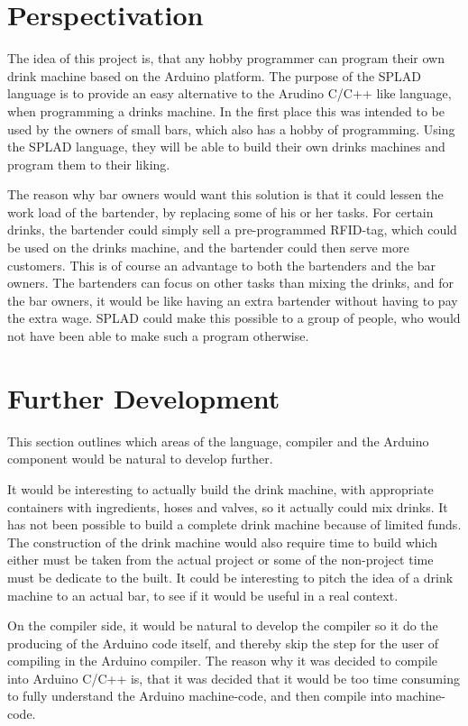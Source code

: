 \section{Perspectivation}
\label{sec:perspektivering}
The idea of this project is, that any hobby programmer can program their own drink machine based on the Arduino platform. The purpose of the SPLAD language is to provide an easy alternative to the Arudino C/C++ like language, when programming a drinks machine. In the first place this was intended to be used by the owners of small bars, which also has a hobby of programming. Using the SPLAD language, they will be able to build their own drinks machines and program them to their liking.

The reason why bar owners would want this solution is that it could lessen the work load of the bartender, by replacing some of his or her tasks. For certain drinks, the bartender could simply sell a pre-programmed RFID-tag, which could be used on the drinks machine, and the bartender could then serve more customers. This is of course an advantage to both the bartenders and the bar owners. The bartenders can focus on other tasks than mixing the drinks, and for the bar owners, it would be like having an extra bartender without having to pay the extra wage. SPLAD could make this possible to a group of people, who would not have been able to make such a program otherwise.

\section{Further Development}
This section outlines which areas of the language, compiler and the Arduino component would be natural to develop further.

It would be interesting to actually build the drink machine, with appropriate containers with ingredients, hoses and valves, so it actually could mix drinks. It has not been possible to build a complete drink machine because of limited funds. The construction of the drink machine would also require time to build which either must be taken from the actual project or some of the non-project time must be dedicate to the built. It could be interesting to pitch the idea of a drink machine to an actual bar, to see if it would be useful in a real context.

On the compiler side, it would be natural to develop the compiler so it do the producing of the Arduino code itself, and thereby skip the step for the user of compiling in the Arduino compiler. The reason why it was decided to compile into Arduino C/C++ is, that it was decided that it would be too time consuming to fully understand the Arduino machine-code, and then compile into machine-code.

